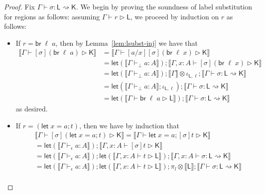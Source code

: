 \documentclass[acmsmall,screen,review]{acmart}
\newcommand{\ms}[1]{\ensuremath{\mathsf{#1}}}
\newcommand{\letstmt}[3]{\ensuremath{\ms{let}\;#1 = #2; #3}}
\newcommand{\brb}[2]{\ms{br}\;#1\;#2}
\newcommand{\bhyp}[2]{#1 : #2}
\newcommand{\hasty}[4]{#1 \vdash_{#2} #3: {#4}}
\newcommand{\haslb}[3]{#1 \vdash #2 \rhd #3}
\newcommand{\lbsubst}[4]{#1 \vdash #2: #3 \rightsquigarrow #4}
\newcommand{\dnt}[1]{\llbracket{#1}\rrbracket}
\newcommand{\lmor}[1]{\ms{let}(#1)}
\begin{document}
\begin{proof}
  Fix $\lbsubst{\Gamma}{\sigma}{\ms{L}}{\ms{K}}$. We begin by proving the soundness of label
  substitution for regions as follows: assuming $\haslb{\Gamma}{r}{\ms{L}}$, we proceed by induction
  on $r$ as follows:
  \begin{itemize}[leftmargin=*]
    \item If $r = \brb{\ell}{a}$, then by Lemma~\ref{lem:lsubst-inj} we have that
    \begin{equation}
      \begin{aligned}
        \dnt{\haslb{\Gamma}{[\sigma](\brb{\ell}{a})}{\ms{K}}}
        & = \dnt{\haslb{\Gamma}{[a/x][\sigma](\brb{\ell}{x})}{\ms{K}}} \\
        & = \lmor{\dnt{\hasty{\Gamma}{\bot}{a}{A}}}
          ; \dnt{\haslb{\Gamma, \bhyp{x}{A}}{[\sigma](\brb{\ell}{x})}{\ms{K}}} \\
        & = \lmor{\dnt{\hasty{\Gamma}{\bot}{a}{A}}}
          ; \dnt{\Gamma} \otimes \iota_{\ms{L}, \ell} 
          ; \dnt{\lbsubst{\Gamma}{\sigma}{\ms{L}}{\ms{K}}}
          \\
        & = \lmor{\dnt{\hasty{\Gamma}{\bot}{a}{A}} ; \iota_{\ms{L}, \ell}}
          ; \dnt{\lbsubst{\Gamma}{\sigma}{\ms{L}}{\ms{K}}} \\
        & = \lmor{\dnt{\haslb{\Gamma}{\brb{\ell}{a}}{\ms{L}}}}
          ; \dnt{\lbsubst{\Gamma}{\sigma}{\ms{L}}{\ms{K}}}
      \end{aligned}
    \end{equation}
    as desired.
    \item If $r = (\letstmt{x}{a}{t})$, then we have by induction that
    \begin{equation}
      \begin{aligned}
        & \dnt{\haslb{\Gamma}{[\sigma](\letstmt{x}{a}{t})}{\ms{K}}} 
          = \dnt{\haslb{\Gamma}{\letstmt{x}{a}{[\sigma]t}}{\ms{K}}} \\
        & = \lmor{\dnt{\hasty{\Gamma}{\epsilon}{a}{A}}}
          ; \dnt{\haslb{\Gamma, \bhyp{x}{A}}{[\sigma]t}{\ms{K}}} \\
        & = \lmor{\dnt{\hasty{\Gamma}{\epsilon}{a}{A}}}
          ; \lmor{\dnt{\haslb{\Gamma, \bhyp{x}{A}}{t}{\ms{L}}}}
          ; \dnt{\lbsubst{\Gamma, \bhyp{x}{A}}{\sigma}{\ms{L}}{\ms{K}}} \\
        & = \lmor{\dnt{\hasty{\Gamma}{\epsilon}{a}{A}}}
          ; \lmor{\dnt{\haslb{\Gamma, \bhyp{x}{A}}{t}{\ms{L}}}}
          ; \pi_l \otimes \dnt{\ms{L}} 
          ; \dnt{\lbsubst{\Gamma}{\sigma}{\ms{L}}{\ms{K}}} \\

\end{aligned}
\end{equation}
\end{itemize}
\end{proof}
\end{document}
